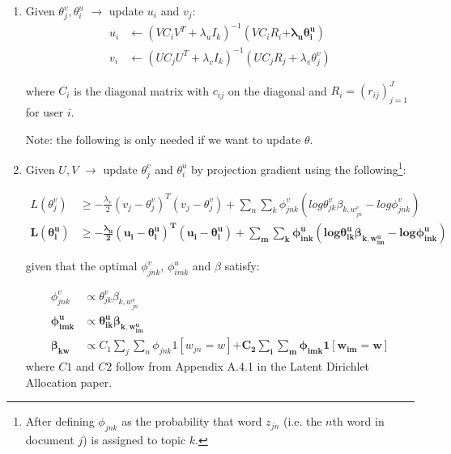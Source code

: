 \documentclass[12pt]{article}
\begin{document}
\begin{enumerate}

\item Given $\theta^v_j,\theta^u_i$  $\rightarrow$ update $u_i$ and $v_j$:
\begin{align*}
u_i &\leftarrow (VC_i V^T + \lambda_u I_k)^{-1} (V C_i R_i \bm{+ \lambda_u \theta^u_i}) \\
v_i &\leftarrow (UC_j U^T + \lambda_v I_k)^{-1} (U C_j R_j + \lambda_v \theta^v_j)
\end{align*}

where $C_i$ is the diagonal matrix with $c_{ij}$ on the diagonal and $R_i = (r_{ij})_{j=1}^J$ for user $i$.

Note: the following is only needed if we want to update $\theta$.


\item Given $U, V$  $\rightarrow$ update $\theta^v_j$ and $\theta^u_i$ by projection gradient using the following\footnote{After defining $\phi_{jnk}$ as the probability that word $z_{jn}$ (i.e. the $n$th word in document $j$) is assigned to topic $k$.}:

\begin{align*}
L(\theta^v_j) &\geq - \frac{\lambda_v}{2} (v_j - \theta^v_j)^T(v_j - \theta^v_j) + \sum_n \sum_k \phi^v_{jnk}(log\theta^v_{jk}\beta_{k,w^v_{jn}} - log \phi^v_{jnk})  \\
\bm{L(\theta^u_i)} &\bm{\geq - \frac{\lambda_u}{2} (u_i - \theta^u_i)^T(u_i - \theta^u_i) + \sum_m \sum_k \phi^u_{ink}(log\theta^u_{ik}\beta_{k,w^u_{im}} - log \phi^u_{ink})}
\end{align*}

given that the optimal $\phi^v_{jnk}$, $\phi^u_{imk}$ and $\beta$ satisfy:

\begin{align*}
\phi^v_{jnk} &\propto \theta^v_{jk} \beta_{k,w^v_{jn}} \\
\bm{\phi^u_{imk}} &\propto \bm{\theta^u_{ik} \beta_{k,w^u_{im}}} \\
\bm{\beta_{kw}} & \propto C_1 \sum_j  \sum_n  \phi_{jnk} 1[w_{jn} = w]  \bm{+   C_2 \sum_i \sum_m  \phi_{imk} 1[w_{im} = w]}
\end{align*}
where $C1$ and $C2$ follow from Appendix A.4.1 in the Latent Dirichlet Allocation paper.



\end{enumerate}
\end{document}
